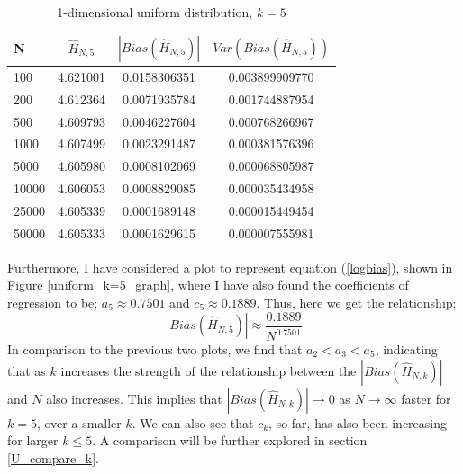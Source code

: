 \documentclass{article}
\begin{document}
\begin{table}
\caption{1-dimensional uniform distribution, $k=5$} \label{uniform_k=5_table}
\begin{center}
\begin{tabular}{| l | c c c|} 
\toprule
N & $\hat{H}_{N, 5}$ & $|Bias(\hat{H}_{N, 5})|$ & $Var(Bias(\hat{H}_{N, 5}))$ \\
\midrule[1pt]
100     & 4.621001     & 0.0158306351     & 0.003899909770  \\
200     & 4.612364     & 0.0071935784     & 0.001744887954  \\
500     & 4.609793     & 0.0046227604     & 0.000768266967  \\
1000    & 4.607499     & 0.0023291487     & 0.000381576396  \\
5000    & 4.605980     & 0.0008102069     & 0.000068805987  \\
10000   & 4.606053     & 0.0008829085     & 0.000035434958  \\
25000   & 4.605339     & 0.0001689148     & 0.000015449454  \\
50000   & 4.605333     & 0.0001629615     & 0.000007555981  \\
\hline
\end{tabular}
\end{center}
\end{table}

Furthermore, I have considered a plot to represent equation (\ref{logbias}), shown in Figure \ref{uniform_k=5_graph}, where I have also found the coefficients of regression to be; $a_{5} \approx 0.7501$ and $c_{5} \approx 0.1889$. Thus, here we get the relationship;
\begin{equation}
|Bias(\hat{H}_{N, 5})| \approx \frac{0.1889}{N^{0.7501}}\nonumber
\end{equation}
In comparison to the previous two plots, we find that $a_{2} < a_{3} < a_{5}$, indicating that as $k$ increases the strength of the relationship between the $|Bias(\hat{H}_{N, k})|$ and $N$ also increases. This implies that $|Bias(\hat{H}_{N, k})| \to 0$ as $N \to \infty$ faster for $k=5$, over a smaller $k$. We can also see that $c_{k}$, so far, has also been increasing for larger $k \leq 5$. A comparison will be further explored in section \ref{U_compare_k}.
\end{document}
